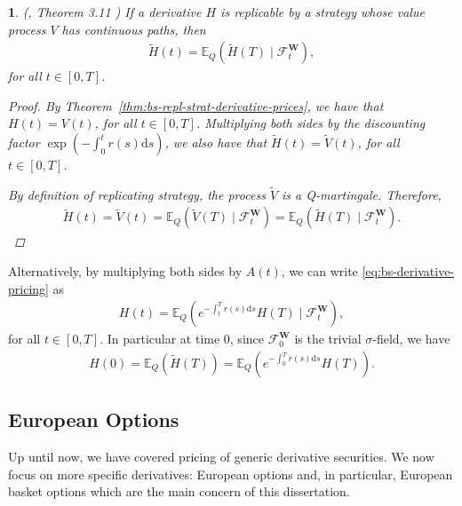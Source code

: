 \documentclass[english]{article}
\numberwithin{equation}{section}
\numberwithin{figure}{section}
\theoremstyle{bolddescit}
\newtheorem{theorem}{\protect\theoremname}[section]
\theoremstyle{definition}
\theoremstyle{definition}
\theoremstyle{plain}
\theoremstyle{plain}
\theoremstyle{bolddesc}
\theoremstyle{plain}
\theoremstyle{remark}
\providecommand{\theoremname}{Theorem}
\begin{document}
\begin{theorem}\label{thm:bs-derivative-pricing}
  (\cite{capinski_blackscholes_2012}, Theorem 3.11 )
  If a derivative $H$ is replicable by a strategy whose value process $V$ has continuous paths, then
  \begin{align}\label{eq:bs-derivative-pricing}
    \widetilde{H}(t) = \mathbb{E}_Q(\widetilde{H}(T) \mid \mathcal{F}^\mathbf{W}_t),
  \end{align}
  for all $t \in [0,T]$.

  \begin{proof}
    By Theorem~\ref{thm:bs-repl-strat-derivative-prices}, we have that $H(t) = V(t)$, for all $t \in [0,T]$. Multiplying both sides by the discounting factor $\exp\left(-\int_0^t r(s) \mathrm{d}s\right)$, we also have that $\widetilde{H}(t) = \widetilde{V}(t)$, for all $t \in [0,T]$.

    By definition of replicating strategy, the process $\widetilde{V}$ is a Q-martingale. Therefore,
    \begin{align*}
      \widetilde{H}(t) = \widetilde{V}(t)
      = \mathbb{E}_Q(\widetilde{V}(T) \mid \mathcal{F}^\mathbf{W}_t)
      = \mathbb{E}_Q(\widetilde{H}(T) \mid \mathcal{F}^\mathbf{W}_t).
    \end{align*}
  \end{proof}
\end{theorem}

Alternatively, by multiplying both sides by $A(t)$, we can write \eqref{eq:bs-derivative-pricing} as
\begin{align*}
  H(t) = \mathbb{E}_Q\left(e^{-\int_t^T r(s) \mathrm{d}s} H(T) \mid \mathcal{F}^\mathbf{W}_t\right),
\end{align*}
for all $t \in [0,T]$. In particular at time 0, since $\mathcal{F}^\mathbf{W}_0$ is the trivial $\sigma$-field, we have
\begin{align*}
  H(0) = \mathbb{E}_Q\left(\widetilde{H}(T)\right)
  = \mathbb{E}_Q\left(e^{-\int_0^T r(s) \mathrm{d}s} H(T)\right).
\end{align*}

\subsection{European Options}

Up until now, we have covered pricing of generic derivative securities. We now focus on more specific derivatives: European options and, in particular, European basket options which are the main concern of this dissertation.
\end{document}
